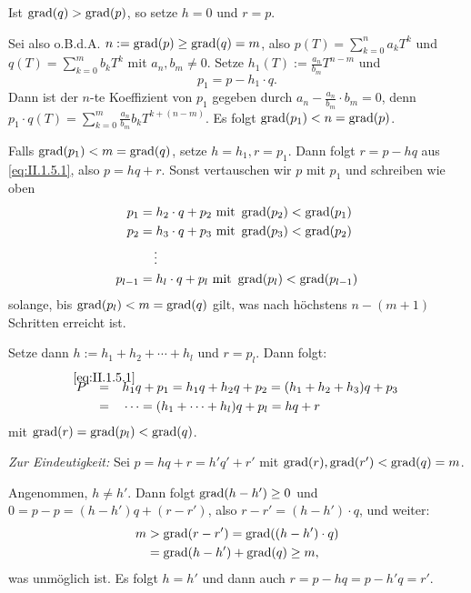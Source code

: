 \begin{beweis}
	Ist $\operatorname{grad}(q) > \operatorname{grad}(p)$, so setze $h=0$ und $r=p$.
	
	Sei also o.B.d.A. $n := \operatorname{grad}(p) \geq \operatorname{grad}(q) = m$, also $p(T) = \sum_{k=0}^{n} a_kT^{k}$ und $q(T) = \sum_{k=0}^{m} b_kT^{k}$ mit $a_n,b_m \neq 0$. Setze $h_1(T) := \frac{a_n}{b_m} T^{n-m}$ und
	\begin{equation}
		p_1 = p-h_1 \cdot q. \label{eq:II.1.5.1}
	\end{equation}
	Dann ist der $n$-te Koeffizient von $p_1$ gegeben durch $a_n - \frac{a_n}{b_m} \cdot b_m = 0$, denn $p_1 \cdot q(T) = \sum_{k=0}^{m} \frac{a_n}{b_m} b_k T^{k+(n-m)}$.
	Es folgt $\operatorname{grad}(p_1) < n = \operatorname{grad}(p)$.
	
	Falls $\operatorname{grad}(p_1) < m = \operatorname{grad}(q)$, setze $h = h_1, r= p_1$.
	Dann folgt $r = p-hq$ aus \eqref{eq:II.1.5.1}, also $p = hq+r$.
	Sonst vertauschen wir $p$ mit $p_1$ und schreiben wie oben
	\begin{align*}
		p_1 &= h_2 \cdot q + p_2 \text{ mit } \operatorname{grad}(p_2) < \operatorname{grad}(p_1) \\
		p_2 &= h_3 \cdot q + p_3 \text{ mit } \operatorname{grad}(p_3) < \operatorname{grad}(p_2) \\
		&\quad \vdots \\
		p_{l-1} &= h_l \cdot q + p_l \text{ mit } \operatorname{grad}(p_l) < \operatorname{grad}(p_{l-1})
	\end{align*}
	solange, bis $\operatorname{grad}(p_l) < m = \operatorname{grad}(q)$ gilt, was nach höchstens $n-(m+1)$ Schritten erreicht ist.
	
	Setze dann $h := h_1 + h_2 + \cdots + h_l$ und $r = p_l$.
	Dann folgt:
	\begin{align*}
		P &\stack{\eqref{eq:II.1.5.1}}{=} h_1 q + p_1 = h_1 q + h_2 q + p_2 =  (h_1+h_2+h_3)q + p_3 \\
		&\stack{}{=} \dots = (h_1 + \dots + h_l)q + p_l = hq + r
	\end{align*}
	mit $\operatorname{grad}(r) = \operatorname{grad}(p_l) < \operatorname{grad}(q)$.
	
	\textit{Zur Eindeutigkeit:} Sei $p = hq + r = h'q'+r'$ mit $\operatorname{grad}(r), \operatorname{grad}(r') < \operatorname{grad}(q) = m$.
	
	Angenommen, $h \neq h'$.
	Dann folgt $\operatorname{grad}(h-h') \geq 0$ und $0 = p-p = (h-h')q + (r-r')$, also $r-r' = (h-h') \cdot q$, und weiter:
	\begin{align*}
		m &> \operatorname{grad}(r-r') = \operatorname{grad}((h-h')\cdot q) \\
		&= \operatorname{grad}(h-h') + \operatorname{grad}(q) \geq m,
	\end{align*}
	was unmöglich ist.
	Es folgt $h = h'$ und dann auch $r = p-hq = p-h'q = r'$. \qedhere
\end{beweis}

